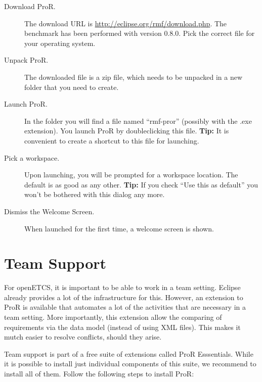 \documentclass{template/openetcs_report}
\begin{document}
\begin{description}

\item[Download ProR.]  The download URL is \url{http://eclipse.org/rmf/download.php}.  The benchmark has been performed with version 0.8.0.  Pick the correct file for your operating system.

\item[Unpack ProR.]  The downloaded file is a zip file, which needs to be unpacked in a new folder that you need to create.

\item[Launch ProR.] In the folder you will find a file named ``rmf-pror'' (possibly with the .exe extension).  You launch ProR by doubleclicking this file. \textbf{Tip:} It is convenient to create a shortcut to this file for launching.

\item[Pick a workspace.] Upon launching, you will be prompted for a workspace location.  The default is as good as any other. \textbf{Tip:} If you check ``Use this as default'' you won't be bothered with this dialog any more.

\item[Dismiss the Welcome Screen.] When launched for the first time, a welcome screen is shown.

\end{description}

\section{Team Support}

For openETCS, it is important to be able to work in a team setting.  Eclipse already provides a lot of the infrastructure for this.  However, an extension to ProR is available that automates a lot of the activities that are necessary in a team setting.  More importantly, this extension allow the comparing of requirements via the data model (instead of using XML files).  This makes it mutch easier to resolve conflicts, should they arise.

Team support is part of a free suite of extensions called ProR Esssentials.  While it is possible to install just individual components of this suite, we recommend to install all of them.  Follow the following steps to install ProR:
\end{document}
